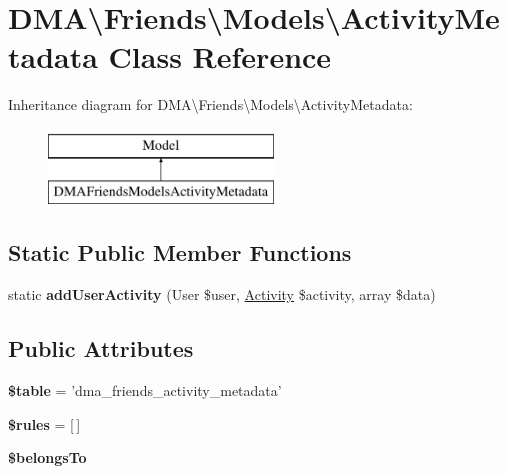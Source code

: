 \hypertarget{classDMA_1_1Friends_1_1Models_1_1ActivityMetadata}{\section{D\+M\+A\textbackslash{}Friends\textbackslash{}Models\textbackslash{}Activity\+Metadata Class Reference}
\label{classDMA_1_1Friends_1_1Models_1_1ActivityMetadata}
}
Inheritance diagram for D\+M\+A\textbackslash{}Friends\textbackslash{}Models\textbackslash{}Activity\+Metadata\+:\begin{figure}[H]
\begin{center}
\leavevmode
\includegraphics[height=2.000000cm]{de/d4f/classDMA_1_1Friends_1_1Models_1_1ActivityMetadata}
\end{center}
\end{figure}
\subsection*{Static Public Member Functions}
\begin{DoxyCompactItemize}
\item 
\hypertarget{classDMA_1_1Friends_1_1Models_1_1ActivityMetadata_aeebfd8f11220b629898c1c969714671c}{static {\bfseries add\+User\+Activity} (User \$user, \hyperlink{classDMA_1_1Friends_1_1Models_1_1Activity}{Activity} \$activity, array \$data)}\label{classDMA_1_1Friends_1_1Models_1_1ActivityMetadata_aeebfd8f11220b629898c1c969714671c}

\end{DoxyCompactItemize}
\subsection*{Public Attributes}
\begin{DoxyCompactItemize}
\item 
\hypertarget{classDMA_1_1Friends_1_1Models_1_1ActivityMetadata_a9c8aa7ea6d9f45141918ce6b7a570bc3}{{\bfseries \$table} = 'dma\+\_\+friends\+\_\+activity\+\_\+metadata'}\label{classDMA_1_1Friends_1_1Models_1_1ActivityMetadata_a9c8aa7ea6d9f45141918ce6b7a570bc3}

\item 
\hypertarget{classDMA_1_1Friends_1_1Models_1_1ActivityMetadata_a8038b90e92fe76cd7f7b86d32c8b01b8}{{\bfseries \$rules} = \mbox{[}$\,$\mbox{]}}\label{classDMA_1_1Friends_1_1Models_1_1ActivityMetadata_a8038b90e92fe76cd7f7b86d32c8b01b8}

\item 
{\bfseries \$belongs\+To}
\end{DoxyCompactItemize}
